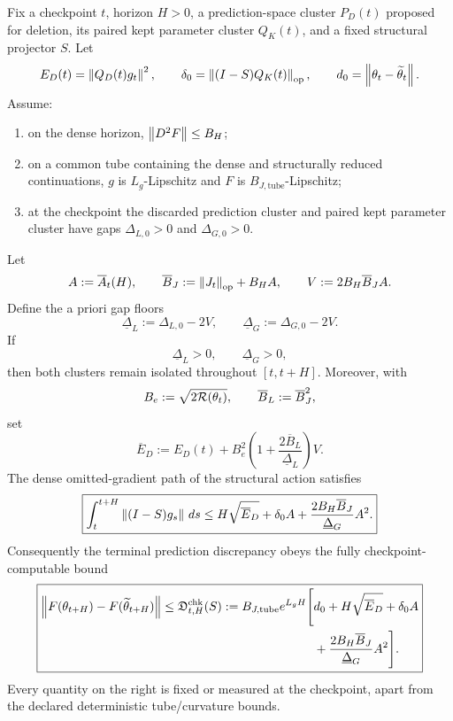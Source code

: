 \begin{theorem}\label{thm:checkpoint-certificate}
Fix a checkpoint $t$, horizon $H>0$, a prediction-space cluster $P_D(t)$ proposed for deletion, its paired kept parameter cluster $Q_K(t)$, and a fixed structural projector $S$. Let
\[
E_D(t)=\left\lVert Q_D(t)g_t\right\rVert^2,
\qquad
\delta_0=\left\lVert (I-S)Q_K(t)\right\rVert_{\mathrm{op}},
\qquad
 d_0=\left\lVert \theta_t-\widetilde\theta_t\right\rVert.
\]
Assume:
\begin{enumerate}[label=(\roman*)]
\item on the dense horizon, $\left\lVert D^2F\right\rVert\le B_H$;
\item on a common tube containing the dense and structurally reduced continuations, $g$ is $L_g$-Lipschitz and $F$ is $B_{J,\mathrm{tube}}$-Lipschitz;
\item at the checkpoint the discarded prediction cluster and paired kept parameter cluster have gaps $\Delta_{L,0}>0$ and $\Delta_{G,0}>0$.
\end{enumerate}
Let
\[
A:=\overline A_t(H),
\qquad
\overline B_J:=\left\lVert J_t\right\rVert_{\mathrm{op}}+B_HA,
\qquad
V:=2B_H\overline B_JA.
\]
Define the a priori gap floors
\[
\underline\Delta_L:=\Delta_{L,0}-2V,
\qquad
\underline\Delta_G:=\Delta_{G,0}-2V.
\]
If
\[
\boxed{
\underline\Delta_L>0,
\qquad
\underline\Delta_G>0,}
\]
then both clusters remain isolated throughout $[t,t+H]$. Moreover, with
\[
B_e:=\sqrt{2\mathcal R(\theta_t)},
\qquad
\overline B_L:=\overline B_J^2,
\]
set
\[
\overline E_D
:=E_D(t)
+B_e^2
\left(1+\frac{2\overline B_L}{\underline\Delta_L}\right)V.
\]
The dense omitted-gradient path of the structural action satisfies
\[
\boxed{
\int_t^{t+H}\left\lVert (I-S)g_s\right\rVert\,ds
\le
H\sqrt{\overline E_D}
+\delta_0A
+\frac{2B_H\overline B_J}{\underline\Delta_G}A^2.}
\]
Consequently the terminal prediction discrepancy obeys the fully checkpoint-computable bound
\[
\boxed{
\begin{aligned}
\left\lVert F(\theta_{t+H})-F(\widetilde\theta_{t+H})\right\rVert
\le
\mathfrak D^{\rm chk}_{t,H}(S)
:=B_{J,\mathrm{tube}}e^{L_gH}
\Bigg[
&d_0+H\sqrt{\overline E_D}
+\delta_0A\\
&+\frac{2B_H\overline B_J}{\underline\Delta_G}A^2
\Bigg].
\end{aligned}}
\]
Every quantity on the right is fixed or measured at the checkpoint, apart from the declared deterministic tube/curvature bounds.
\end{theorem}

